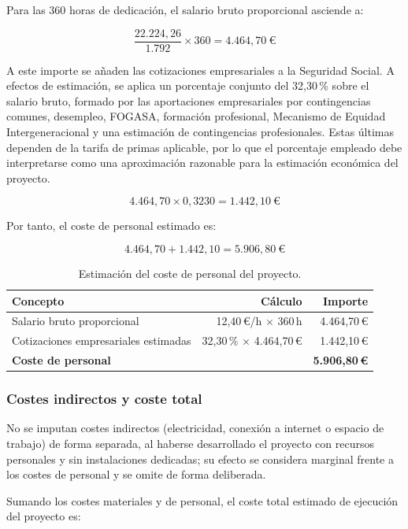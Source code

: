 \documentclass[
  spanish,
  a4paper,
  12pt,
  twoside]{memoir}
\begin{document}
Para las 360 horas de dedicación, el salario bruto proporcional asciende a:

\[
\frac{22.224{,}26}{1.792} \times 360 = 4.464{,}70\ \text{€}
\]

A este importe se añaden las cotizaciones empresariales a la Seguridad Social. A efectos de estimación, se aplica un porcentaje conjunto del 32,30\,\% sobre el salario bruto, formado por las aportaciones empresariales por contingencias comunes, desempleo, FOGASA, formación profesional, Mecanismo de Equidad Intergeneracional y una estimación de contingencias profesionales. Estas últimas dependen de la tarifa de primas aplicable, por lo que el porcentaje empleado debe interpretarse como una aproximación razonable para la estimación económica del proyecto.

\[
4.464{,}70 \times 0{,}3230 = 1.442{,}10\ \text{€}
\]

Por tanto, el coste de personal estimado es:

\[
4.464{,}70 + 1.442{,}10 = 5.906{,}80\ \text{€}
\]

\begin{table}[H]
\centering
\caption{Estimación del coste de personal del proyecto.}
\label{tab:coste_laboral}
\begin{tabular}{lrr}
\toprule
\textbf{Concepto} & \textbf{Cálculo} & \textbf{Importe} \\
\midrule
Salario bruto proporcional & 12,40\,€/h $\times$ 360\,h & 4.464,70\,€ \\
Cotizaciones empresariales estimadas & 32,30\,\% $\times$ 4.464,70\,€ & 1.442,10\,€ \\
\midrule
\textbf{Coste de personal} &  & \textbf{5.906,80\,€} \\
\bottomrule
\end{tabular}
\end{table}

\subsubsection*{Costes indirectos y coste total}

No se imputan costes indirectos (electricidad, conexión a internet o espacio de trabajo) de forma separada, al haberse desarrollado el proyecto con recursos personales y sin instalaciones dedicadas; su efecto se considera marginal frente a los costes de personal y se omite de forma deliberada.

Sumando los costes materiales y de personal, el coste total estimado de ejecución del proyecto es:
\end{document}
